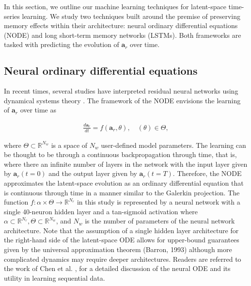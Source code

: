 \documentclass[preprint,12pt]{elsarticle}
\begin{document}
In this section, we outline our machine learning techniques for latent-space time-series learning. We study two techniques built around the premise of preserving memory effects within their architecture: neural ordinary differential equations (NODE) and long short-term memory networks (LSTMs). Both frameworks are tasked with predicting the evolution of $\mathbf{a}_r$ over time. 

\subsection{Neural ordinary differential equations}

In recent times,  several studies  have interpreted residual neural networks using dynamical systems theory \cite{haber2017stable,ruthotto2018deep,behrmann2018invertible,reshniak2019robust}. The framework of the NODE \cite{chen2018neural} envisions the learning of $\mathbf{a}_r$ over time as
\begin{linenomath*}
\begin{align}
\frac{d \mathbf{a}_r}{d t}=f(\mathbf{a}_r, \theta), \quad (\theta) \in \Theta,
\end{align}
\end{linenomath*}
where $\Theta \subset \mathbb{R}^{N_w}$ is a space of $N_w$ user-defined model parameters. The learning can be thought to be through a continuous backpropagation through time, that is, where there an infinite number of layers in the network with the input layer given by $\mathbf{a}_r(t=0)$ and the output layer given by $\mathbf{a}_r(t=T)$. Therefore, the NODE approximates the latent-space evolution as an ordinary differential equation that is continuous through time in a manner similar to the Galerkin projection. The function $f : \alpha \times \Theta \rightarrow \mathbb{R}^{N_r}$ in this study is represented by a neural network with a single 40-neuron hidden layer and a tan-sigmoid activation where $\alpha \subset \mathbb{R}^{N_r}, \Theta \subset \mathbb{R}^{N_w}$, and $N_w$ is the number of parameters of the neural network architecture. Note that the assumption of a single hidden layer architecture for the right-hand side of the latent-space ODE allows for upper-bound guarantees given by the universal approximation theorem (Barron, 1993)
although more complicated dynamics may require deeper architectures. Readers are referred to the work of Chen et al. \cite{chen2018neural}, for a detailed discussion of the neural ODE and its utility in learning sequential data. 
\end{document}
